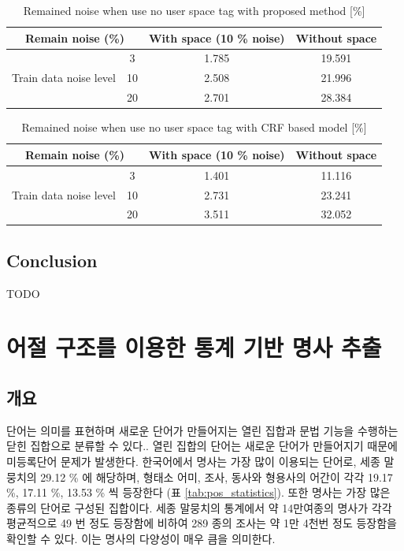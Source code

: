 \documentclass[11pt]{article}
\begin{document}
\begin{table}[H]
\centering
\label{tab:no_use_user_space_proposed}
\caption{Remained noise when use no user space tag with proposed method [\%]}
\begin{tabular}{|c|c|c|c|}
\hline
\multicolumn{2}{|c|}{Remain noise (\%)} & With space (10 \% noise) & Without space \\ \hline
\multirow{3}{*}{Train data noise level} & 3 & 1.785 & 19.591 \\ \cline{2-4} 
 & 10 & 2.508 & 21.996 \\ \cline{2-4} 
 & 20 & 2.701 & 28.384 \\ \hline
\end{tabular}
\end{table}

\begin{table}[H]
\centering
\label{tab:no_use_user_space_crf}
\caption{Remained noise when use no user space tag with CRF based model [\%]}
\begin{tabular}{|c|c|c|c|}
\hline
\multicolumn{2}{|c|}{Remain noise (\%)} & With space (10 \% noise) & Without space \\ \hline
\multirow{3}{*}{Train data noise level} & 3 & 1.401 & 11.116 \\ \cline{2-4} 
 & 10 & 2.731 & 23.241 \\ \cline{2-4} 
 & 20 & 3.511 & 32.052 \\ \hline
\end{tabular}
\end{table}

\subsection{Conclusion}

TODO
\vspace{3cm}

\newpage
\section{어절 구조를 이용한 통계 기반 명사 추출}

\subsection{개요}

단어는 의미를 표현하며 새로운 단어가 만들어지는 열린 집합과 문법 기능을 수행하는 닫힌 집합으로 분류할 수 있다.\citep{jurafsky2000speech}.
열린 집합의 단어는 새로운 단어가 만들어지기 때문에 미등록단어 문제가 발생한다.
한국어에서 명사는 가장 많이 이용되는 단어로, 세종 말뭉치의 29.12 \% 에 해당하며, 형태소 어미, 조사, 동사와 형용사의 어간이 각각 19.17 \%, 17.11 \%, 13.53 \% 씩 등장한다 (표 \ref{tab:pos_statistics}).
또한 명사는 가장 많은 종류의 단어로 구성된 집합이다.
세종 말뭉치의 통계에서 약 14만여종의 명사가 각각 평균적으로 49 번 정도 등장함에 비하여 289 종의 조사는 약 1만 4천번 정도 등장함을 확인할 수 있다.
이는 명사의 다양성이 매우 큼을 의미한다.
\end{document}
